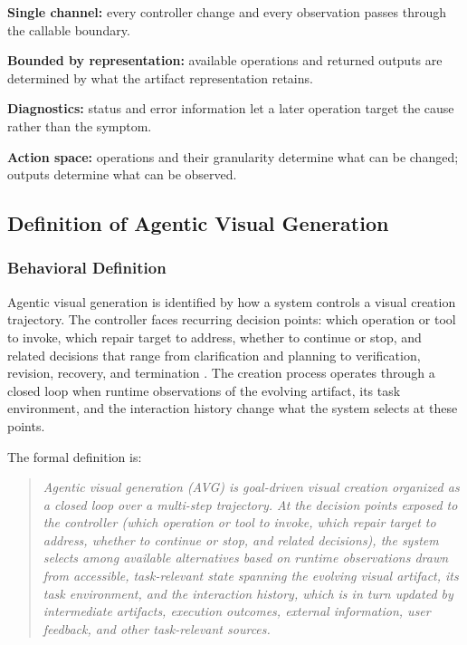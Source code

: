 \begin{keytakeaway}
\begin{keypoints}
  \item \textbf{Single channel:} every controller change and every observation passes through the callable boundary.
  \item \textbf{Bounded by representation:} available operations and returned outputs are determined by what the artifact representation retains.
  \item \textbf{Diagnostics:} status and error information let a later operation target the cause rather than the symptom.
  \item \textbf{Action space:} operations and their granularity determine what can be changed; outputs determine what can be observed.
\end{keypoints}
\end{keytakeaway}




\subsection{Definition of Agentic Visual Generation}
\label{sec:agentic-visual-generation}

\subsubsection{Behavioral Definition}

Agentic visual generation is identified by how a system controls a visual creation trajectory. The controller faces recurring decision points: which operation or tool to invoke, which repair target to address, whether to continue or stop, and related decisions that range from clarification and planning to verification, revision, recovery, and termination \cite{xie2024large,durante2024agentai,jiang2024rationality,schneider2025generative}. The creation process operates through a closed loop when runtime observations of the evolving artifact, its task environment, and the interaction history change what the system selects at these points.

The formal definition is:

\begin{quote}
\emph{Agentic visual generation (AVG) is goal-driven visual creation organized as a closed loop over a multi-step trajectory. At the decision points exposed to the controller (which operation or tool to invoke, which repair target to address, whether to continue or stop, and related decisions), the system selects among available alternatives based on runtime observations drawn from accessible, task-relevant state spanning the evolving visual artifact, its task environment, and the interaction history, which is in turn updated by intermediate artifacts, execution outcomes, external information, user feedback, and other task-relevant sources.}
\end{quote}

